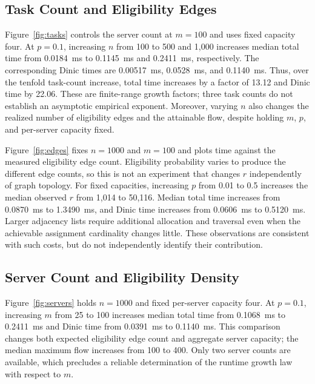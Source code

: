 \subsection{Task Count and Eligibility Edges}
Figure~\ref{fig:tasks} controls the server count at $m=100$ and uses fixed
capacity four. At $p=0.1$, increasing $n$ from 100 to 500 and 1,000 increases
median total time from 0.0184~ms to 0.1145~ms and 0.2411~ms, respectively.
The corresponding Dinic times are 0.00517~ms, 0.0528~ms, and 0.1140~ms.
Thus, over the tenfold task-count increase, total time increases by a factor
of 13.12 and Dinic time by 22.06. These are finite-range growth factors;
three task counts do not establish an asymptotic empirical exponent.
Moreover, varying $n$ also changes the realized number of eligibility edges
and the attainable flow, despite holding $m$, $p$, and per-server capacity fixed.

Figure~\ref{fig:edges} fixes $n=1000$ and $m=100$ and plots time against
the measured eligibility edge count. Eligibility probability varies to produce
the different edge counts, so this is not an experiment that changes $r$
independently of graph topology. For fixed capacities, increasing $p$ from
0.01 to 0.5 increases the median observed $r$ from 1,014 to 50,116.
Median total time increases from 0.0870~ms to 1.3490~ms, and Dinic time
increases from 0.0606~ms to 0.5120~ms. Larger adjacency lists require
additional allocation and traversal even when the achievable assignment
cardinality changes little. These observations are consistent with such costs,
but do not independently identify their contribution.

\subsection{Server Count and Eligibility Density}
Figure~\ref{fig:servers} holds $n=1000$ and fixed per-server capacity four.
At $p=0.1$, increasing $m$ from 25 to 100 increases median total time from
0.1068~ms to 0.2411~ms and Dinic time from 0.0391~ms to 0.1140~ms.
This comparison changes both expected eligibility edge count and aggregate
server capacity; the median maximum flow increases from 100 to 400.
Only two server counts are available, which precludes a reliable determination
of the runtime growth law with respect to $m$.

